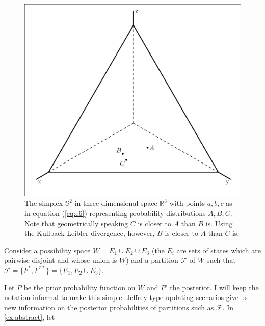 \documentclass[11pt]{article}
\begin{document}
\begin{figure}[ht]
  \begin{flushright}
    \begin{minipage}[h]{.7\linewidth}
      \includegraphics[width=\textwidth]{threepoints.eps}
      \caption{\footnotesize The simplex $\mathbb{S}^{2}$ in
        three-dimensional space $\mathbb{R}^{3}$ with points $a,b,c$
        as in equation (\ref{eq:e6}) representing probability
        distributions $A,B,C$. Note that geometrically speaking $C$ is
        closer to $A$ than $B$ is. Using the Kullback-Leibler
        divergence, however, $B$ is closer to $A$ than $C$ is.}
      \label{fig:threepoints}
    \end{minipage}
  \end{flushright}
\end{figure}

\begin{quotex}
  \label{ex:abstract} Consider a possibility
  space $W=E_{1}\cup{}E_{2}\cup{}E_{3}$ (the $E_{i}$ are sets of
  states which are pairwise disjoint and whose union is $W$) and a
  partition $\mathcal{F}$ of $W$ such that
  $\mathcal{F}=\{F^{*},F^{**}\}=\{E_{1},E_{2}\cup{}E_{3}\}$.
\end{quotex}

Let $P$ be the prior probability function on $W$ and $P'$ the
posterior. I will keep the notation informal to make this simple.
Jeffrey-type updating scenarios give us new information on the
posterior probabilities of partitions such as $\mathcal{F}$. In
{\xample} \ref{ex:abstract}, let
\end{document}
